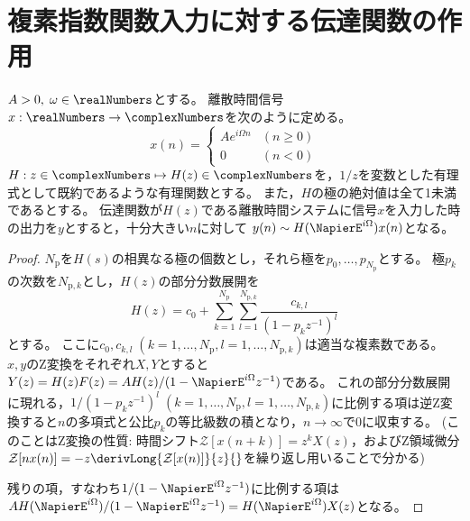 		\section{複素指数関数入力に対する伝達関数の作用}
			\begin{shadebox}
				$A>0,\;\omega \in \realNumbers$とする。
				離散時間信号$x: \realNumbers \to \complexNumbers$を次のように定める。
				\[
					x(n) =
					\begin{cases}
						Ae^{i\Omega n} & (n\geq 0) \\
						0 & (n<0)
					\end{cases}
				\]
				$H: z\in\complexNumbers \mapsto H(z) \in \complexNumbers$を，$1/z$を変数とした有理式として既約であるような有理関数とする。
				また，$H$の極の絶対値は全て1未満であるとする。
				伝達関数が$H(z)$である離散時間システムに信号$x$を入力した時の出力を$y$とすると，十分大きい$n$に対して
				$y(n) \sim H(\NapierE^{i\Omega})x(n)$となる。
			\end{shadebox}
			\begin{proof}
				\quad\par
				$N_\text{p}$を$H(s)$の相異なる極の個数とし，それら極を$p_0,\dots,p_{N_\text{p}}$とする。
				極$p_k$の次数を$N_{\text{p},k}$とし，$H(z)$の部分分数展開を
				\[ H(z) = c_0 + \sum_{k=1}^{N_\mathrm{p}} \sum_{l=1}^{N_{\mathrm{p},k}} \frac{c_{k,l}}{(1-p_kz^{-1})^l} \]
				とする。
				ここに$c_0,c_{k,l}\;(k=1,\dots,N_\mathrm{p},l=1,\dots,N_{\mathrm{p},k})$は適当な複素数である。
				$x,y$のZ変換をそれぞれ$X,Y$とすると$Y(z) = H(z)F(z) = A H(z)/(1-\NapierE^{i\Omega}z^{-1})$である。
				これの部分分数展開に現れる，$1/(1-p_k z^{-1})^l\;(k=1,\dots,N_\mathrm{p},l=1,\dots,N_{\mathrm{p},k})$に比例する項は逆Z変換すると$n$の多項式と公比$p_k$の等比級数の積となり，$n\to\infty$で0に収束する。
				(このことはZ変換の性質: 時間シフト$\mathcal{Z}[x(n+k)] = z^kX(z)$，およびZ領域微分$\mathcal{Z}[nx(n)] = -z\derivLong{\mathcal{Z}[x(n)]}{z}{}$を繰り返し用いることで分かる)
				\par
				残りの項，すなわち$1/(1-\NapierE^{i\Omega}z^{-1})$に比例する項は$AH(\NapierE^{i\Omega})/(1-\NapierE^{i\Omega}z^{-1}) = H(\NapierE^{i\Omega})X(z)$となる。
			\end{proof}
